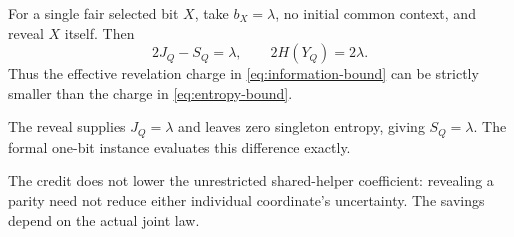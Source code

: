 \begin{proposition}\label{prop:credit-control}
For a single fair selected bit $X$, take $b_X=\lambda$, no initial
common context, and reveal $X$ itself. Then
\[
2J_Q-S_Q=\lambda,
\qquad 2H(Y_Q)=2\lambda.
\]
Thus the effective revelation charge in
\eqref{eq:information-bound} can be strictly smaller than the charge
in \eqref{eq:entropy-bound}.
\end{proposition}
\begin{outline}
The reveal supplies $J_Q=\lambda$ and leaves zero singleton entropy,
giving $S_Q=\lambda$. The formal one-bit instance evaluates this
difference exactly.
\end{outline}
The credit does not lower the unrestricted shared-helper coefficient:
revealing a parity need not reduce either individual coordinate's
uncertainty. The savings depend on the actual joint law.
